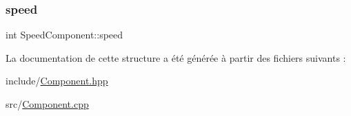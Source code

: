 \subsubsection{\texorpdfstring{speed}{speed}}
{\footnotesize\ttfamily int Speed\+Component\+::speed}



La documentation de cette structure a été générée à partir des fichiers suivants \+:\begin{DoxyCompactItemize}
\item 
include/\hyperlink{Component_8hpp}{Component.\+hpp}\item 
src/\hyperlink{Component_8cpp}{Component.\+cpp}\end{DoxyCompactItemize}

